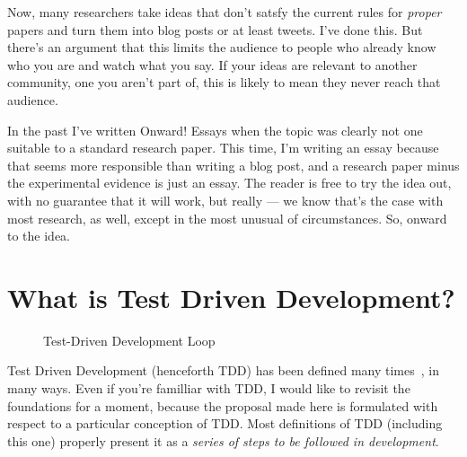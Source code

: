 \documentclass[sigplan,screen]{acmart}
\begin{document}
Now, many researchers take ideas that don't satsfy the current rules
for \emph{proper} papers and turn them into blog posts or at least
tweets.  I've done this.  But there's an argument that this limits the
audience to people who already know who you are and watch what you
say.  If your ideas are relevant to another community, one you aren't
part of, this is likely to mean they never reach that audience.

In the past I've written Onward! Essays when the topic was clearly not
one suitable to a standard research paper.  This time, I'm writing an
essay because that seems more responsible than writing a blog post,
and a research paper minus the experimental evidence is just an
essay.  The reader is free to try the idea out, with no guarantee that
it will work, but really --- we know that's the case with most
research, as well, except in the most unusual of circumstances.  So,
onward to the idea.



\section{What is Test Driven Development?}

\begin{figure}[h!]
  \centering
  \caption{Test-Driven Development Loop}
  \label{fig:tdd}
\end{figure}

Test Driven Development (henceforth TDD) has been defined many times~\cite{beck2002test,astels2003test,TDDIBM,TDDAcademy},
in many ways.  Even if you're familliar with TDD, I would like to
revisit the foundations for a moment, because the proposal made here
is formulated with respect to a particular conception of TDD.  Most
definitions of TDD (including this one) properly present it as a
\emph{series of steps to be followed in development}.
\end{document}
